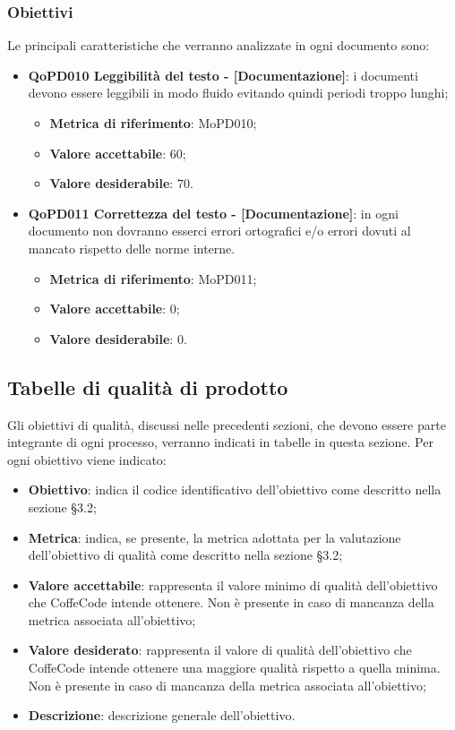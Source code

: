 \documentclass[../piano-di-qualifica.tex]{subfiles}
\begin{document}
\subsubsection{Obiettivi}
\label{sub:obiettivi}
Le principali caratteristiche che verranno analizzate in ogni documento sono:
\begin{itemize}
    \item \textbf{QoPD010 Leggibilità del testo - [Documentazione]}: i documenti devono essere leggibili in modo fluido evitando quindi periodi troppo lunghi;
        \begin{itemize}
            \item \textbf{Metrica di riferimento}: MoPD010;
            \item \textbf{Valore accettabile}: 60;
            \item \textbf{Valore desiderabile}: 70.
        \end{itemize}
    \item \textbf{QoPD011 Correttezza del testo - [Documentazione]}: in ogni documento non dovranno esserci errori ortografici e/o errori dovuti al mancato rispetto delle norme interne.
        \begin{itemize}
            \item \textbf{Metrica di riferimento}: MoPD011;
            \item \textbf{Valore accettabile}: 0;
            \item \textbf{Valore desiderabile}: 0.
        \end{itemize}
\end{itemize}

\subsection{Tabelle di qualità di prodotto}
\label{sub:tabelle_di_qualita_di_prodotto}
Gli obiettivi di qualità, discussi nelle precedenti sezioni, che devono essere parte integrante di ogni processo, verranno indicati in tabelle in questa sezione.
Per ogni obiettivo viene indicato:

\begin{itemize}
   \item \textbf{Obiettivo}: indica il codice identificativo dell'obiettivo come descritto nella sezione §3.2;
   \item \textbf{Metrica}: indica, se presente, la metrica adottata per la valutazione dell'obiettivo di qualità come descritto nella sezione §3.2;
   \item \textbf{Valore accettabile}: rappresenta il valore minimo di qualità dell'obiettivo che CoffeCode intende ottenere. Non è presente in caso di mancanza della metrica associata all'obiettivo;
   \item \textbf{Valore desiderato}: rappresenta il valore di qualità dell'obiettivo che CoffeCode intende ottenere una maggiore qualità rispetto a quella minima. Non è presente in caso di mancanza della metrica associata all'obiettivo;
   \item \textbf{Descrizione}: descrizione generale dell'obiettivo.
\end{itemize}
\end{document}
